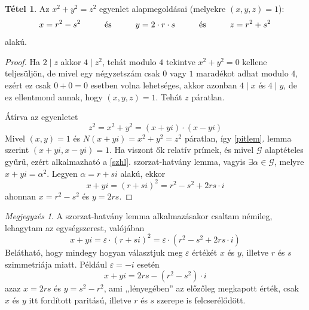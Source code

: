 \documentclass[12pt]{book}
\theoremstyle{plain} %
\theoremstyle{definition} %
\newtheorem{theo/}{Tétel}[section]
\newenvironment{theo}
  {\renewcommand{\qedsymbol}{$\clubsuit$}%
   \pushQED{\qed}\begin{theo/}}
  {\popQED\end{theo/}}
\theoremstyle{remark}
\newtheorem*{mj}{Megjegyzés}
\renewcommand\qedsymbol{$\blacksquare$}
\numberwithin{equation}{section}  %
\def\G{\mathcal{G}}
\begin{document}
	\begin{theo}
		Az $x^2+y^2=z^2$ egyenlet alapmegoldásai (melyekre $(x,y,z)=1$):
		\[ x=r^2-s^2 \hspace{10mm} \text{és} \hspace{10mm} y=2\cdot r \cdot s \hspace{10mm} \text{és} \hspace{10mm} z = r^2 + s^2 \]
		alakú.
	\end{theo}

	\begin{proof}
		Ha $2\mid z$ akkor $4\mid z^2$, tehát modulo $4$ tekintve $x^2+y^2=0$ kellene teljesüljön, de mivel egy négyzetszám csak $0$ vagy $1$ maradékot adhat modulo $4$, ezért ez csak $0+0=0$ esetben volna lehetséges, akkor azonban $4\mid x$ és $4\mid y$, de ez ellentmond annak, hogy $(x,y,z)=1$. Tehát $z$ páratlan.
		

		
		Átírva az egyenletet
		\[ z^2 = x^2+y^2 = (x+yi)\cdot (x-yi)  \]
		Mivel $(x,y)=1$ és $N(x+yi)=x^2+y^2=z^2$ páratlan, így \ref{pitlem}. lemma szerint $(x+yi,x-yi)=1$. Ha viszont ők relatív prímek, és mivel $\G$ alaptételes gyűrű, ezért alkalmazható a \ref{szhl}. szorzat-hatvány lemma, vagyis $\exists \alpha \in \G$, melyre $x+yi=\alpha^2$. Legyen $\alpha = r+si$ alakú, ekkor
		\[ x+yi= (r+si)^2 = r^2-s^2 +2rs\cdot i  \]
		ahonnan $x=r^2-s^2$ és $y=2rs$.
	\end{proof}

	\begin{mj}
		A szorzat-hatvány lemma alkalmazásakor csaltam némileg, lehagytam az egységszerest, valójában
		\[ x+yi = \varepsilon \cdot (r+si)^2 = \varepsilon \cdot (r^2-s^2+2rs\cdot i)  \]
		Belátható, hogy mindegy hogyan választjuk meg $\varepsilon$ értékét $x$ és $y$, illetve $r$ és $s$ szimmetriája miatt. Például $\varepsilon = -i$ esetén
		\[ x+yi = 2rs - (r^2-s^2)\cdot i  \]
		azaz $x=2rs$ és $y=s^2-r^2$, ami ,,lényegében'' az előzőleg megkapott érték, csak $x$ és $y$ itt fordított paritású, illetve $r$ és $s$ szerepe is felcserélődött.
	\end{mj}
	
\end{document}
